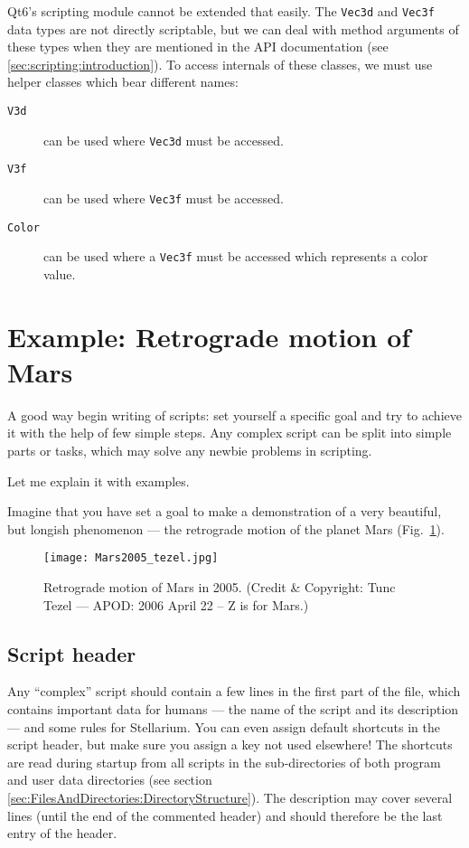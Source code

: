 Qt6's scripting module cannot be extended that easily. The \texttt{Vec3d} and \texttt{Vec3f} data types are not directly scriptable, 
but we can deal with method arguments of these types when they are mentioned in the API documentation (see \ref{sec:scripting:introduction}). 
To access internals of these classes, we must use helper classes which bear different names:
\begin{description}
\item[\texttt{V3d}] can be used where \texttt{Vec3d} must be accessed.
\item[\texttt{V3f}] can be used where \texttt{Vec3f} must be accessed.
\item[\texttt{Color}] can be used where a \texttt{Vec3f} must be accessed which represents a color value.
\end{description}




\section{Example: Retrograde motion of Mars}
\label{sec:scripting:RetrogradeMotionOfMars}
A good way begin writing of scripts: set yourself a specific
goal and try to achieve it with the help of few simple steps. Any
complex script can be split into simple parts or tasks, which may solve any
newbie problems in scripting.

Let me explain it with examples.

Imagine that you have set a goal to make a demonstration of a  very
beautiful, but longish phenomenon --- the retrograde motion of the
planet Mars (Fig.~\ref{fig:Mars2005}).

\begin{figure}[tb]
\centering\texttt{[image: Mars2005\_tezel.jpg]}
\caption{Retrograde motion of Mars in 2005. {\small(Credit \& Copyright: Tunc Tezel --- APOD: 2006 April 22 -- Z is for Mars.)}}
\label{fig:Mars2005}
\end{figure}

\subsection{Script header}
Any ``complex'' script should contain a few lines in the first part of
the file, which contains important data for humans --- the name of the
script and its description --- and some rules for Stellarium. You can
even assign default shortcuts in the script header, but make sure you
assign a key not used elsewhere! The shortcuts are read during startup
from all scripts in the  sub-directories of both program
and user data directories (see section
\ref{sec:FilesAndDirectories:DirectoryStructure}).  The description
may cover several lines (until the end of the commented header) and
should therefore be the last entry of the header.

